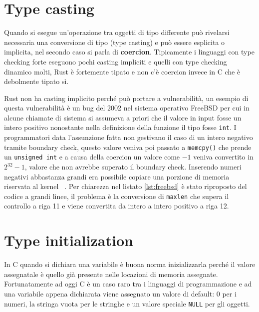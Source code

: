 \documentclass[Lau,binding=0.6cm]{sapthesis}
\begin{document}
\section{Type casting}
Quando si esegue un'operazione tra oggetti di tipo differente può rivelarsi necessaria una conversione di tipo (type casting) e può essere esplicita o implicita, nel secondo caso si parla di \textbf{coercion}. Tipicamente i linguaggi con type checking forte eseguono pochi casting impliciti e quelli con type checking dinamico molti, Rust è fortemente tipato e non c'è coercion invece in C che è debolmente tipato sì.   







Rust non ha casting implicito perché può portare a vulnerabilità, un esempio di questa vulnerabilità è un bug del 2002 nel sistema operativo FreeBSD per cui in alcune chiamate di sistema si assumeva a priori che il valore in input fosse un intero positivo nonostante nella definizione della funzione il tipo fosse \texttt{int}. I programmatori data l'assunzione fatta non gestivano  il caso di un intero negativo tramite boundary check, questo valore veniva poi passato a \colorbox{backcolour}{\texttt{memcpy()}} che prende un \texttt{unsigned int} e a causa della coercion un valore come $-1$ veniva convertito in $2^{32}-1$, valore che non avrebbe superato il boundary check. Inserendo numeri negativi abbastanza grandi era possibile copiare una porzione di memoria riservata al kernel ~\cite{freeBSD_vulnerability}. Per chiarezza nel listato \ref{lst:freebsd} è stato riproposto del codice a grandi linee, il problema è la conversione di \colorbox{backcolour}{\texttt{maxlen}} che supera il controllo a riga 11 e viene convertita da intero a intero positivo a riga 12. 

 

\section{Type initialization} \label{sec:type_initialization}
In C quando si dichiara una variabile è buona norma inizializzarla perché il valore assegnatale è quello già presente nelle locazioni di memoria assegnate. Fortunatamente ad oggi C è un caso raro tra i linguaggi di programmazione e ad una variabile appena dichiarata viene assegnato un valore di default: $0$ per i numeri, la stringa vuota per le stringhe e un valore speciale \texttt{NULL} per gli oggetti.
\end{document}
